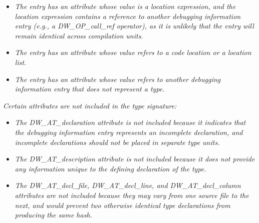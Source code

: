 \begin{itemize}

\item \textit{The entry has an attribute whose value is a location
expression, and the location expression contains a reference to
another debugging information entry (e.g., a DW\_OP\_call\_ref
operator), as it is unlikely that the entry will remain
identical across compilation units.}

\item \textit{The entry has an attribute whose value refers
to a code location or a location list.}

\item \textit{The entry has an attribute whose value refers
to another debugging information entry that does not represent
a type.}
\end{itemize}


\textit{Certain attributes are not included in the type signature:}

\begin{itemize}
\item \textit{The DW\_AT\_declaration attribute is not included because it
indicates that the debugging information entry represents an
incomplete declaration, and incomplete declarations should
not be placed in separate type units.}

\item \textit{The DW\_AT\_description attribute is not included because
it does not provide any information unique to the defining
declaration of the type.}

\item \textit{The DW\_AT\_decl\_file, DW\_AT\_decl\_line, and
DW\_AT\_decl\_column attributes are not included because they
may vary from one source file to the next, and would prevent
two otherwise identical type declarations from producing the
same hash.}

\end{itemize}
